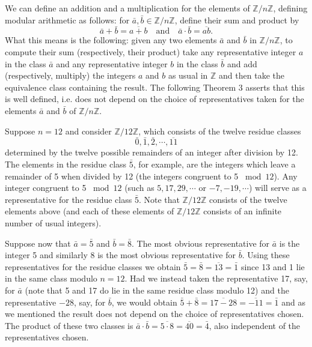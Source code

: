 \documentclass[cn,11pt,chinese]{elegantbook}
\numberwithin{equation}{section}
\begin{document}
We can define an addition and a multiplication for the elements of $\mathbb{Z}/n\mathbb{Z}$, defining modular arithmetic as follows: for $\bar{a}, \bar{b} \in \mathbb{Z}/n\mathbb{Z}$, define their sum and product by
\[
\bar{a} + \bar{b} = \overline{a + b} \quad\text{and}\quad \bar{a} \cdot \bar{b} = \overline{ab}.
\]
What this means is the following: given any two elements $\bar{a}$ and $\bar{b}$ in $\mathbb{Z}/n\mathbb{Z}$, to compute their sum (respectively, their product) take any representative integer $a$ in the class $\bar{a}$ and any representative integer $b$ in the class $\bar{b}$ and add (respectively, multiply) the integers $a$ and $b$ as usual in $\mathbb{Z}$ and then take the equivalence class containing the result. The following Theorem 3 asserts that this is well defined, i.e. does not depend on the choice of representatives taken for the elements $\bar{a}$ and $\bar{b}$ of $\mathbb{Z}/n\mathbb{Z}$.

\begin{example}
Suppose $n=12$ and consider $\mathbb{Z}/12\mathbb{Z}$, which consists of the twelve residue classes
\[
\bar{0},\bar{1},\bar{2},\cdots,\overline{11}
\]
determined by the twelve possible remainders of an integer after division by 12. The elements in the residue class $\bar{5}$, for example, are the integers which leave a remainder of 5 when divided by 12 (the integers congruent to 5 $\bmod{12}$). Any integer congruent to 5 $\bmod{12}$ (such as $5,17, 29, \cdots$ or $-7, -19, \cdots$) will serve as a representative for the residue class $\bar{5}$. Note that $\mathbb{Z}/12\mathbb{Z}$ consists of the twelve elements above (and each of these elements of $\mathbb{Z}/12\mathbb{Z}$ consists of an infinite number of usual integers).

Suppose now that $\bar{a}=\bar{5}$ and $\bar{b} = \bar{8}$. The most obvious representative for $\bar{a}$ is the integer 5 and similarly 8 is the most obvious representative for $\bar{b}$. Using these representatives for the residue classes we obtain $\bar{5} = \bar{8} = \overline{13} = \bar{1}$ since 13 and 1 lie in the same class modulo $n=12$. Had we instead taken the representative 17, say, for $\bar{a}$ (note that 5 and 17 do lie in the same residue class modulo 12) and the representative $-28$, say, for $\bar{b}$, we would obtain $\bar{5} + \bar{8} = \overline{17 - 28} = \overline{-11} = \bar{1}$ and as we mentioned the result does not depend on the choice of representatives chosen. The product of these two classes is $\bar{a} \cdot \bar{b} = \overline{5 \cdot 8} = \overline{40} = \bar{4}$, also independent of the representatives chosen.
\end{example}
\end{document}

